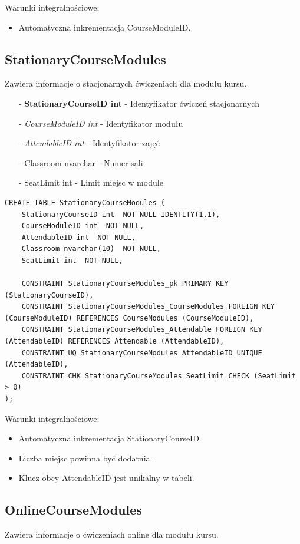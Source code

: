 \documentclass[11pt,a4paper]{article}
\begin{document}
Warunki integralnościowe:
\begin{itemize}
    \item Automatyczna inkrementacja CourseModuleID.
\end{itemize}

\subsection{StationaryCourseModules}
Zawiera informacje o stacjonarnych ćwiczeniach dla modułu kursu.

\begin{itemize}
    \item[-] \textbf{StationaryCourseID int} - Identyfikator ćwiczeń stacjonarnych
    \item[-] \textit{CourseModuleID int} - Identyfikator modułu
    \item[-] \textit{AttendableID int} - Identyfikator zajęć
    \item[-] Classroom nvarchar - Numer sali
    \item[-] SeatLimit int - Limit miejsc w module
\end{itemize}

\begin{Verbatim}[breaklines=true]
CREATE TABLE StationaryCourseModules (
    StationaryCourseID int  NOT NULL IDENTITY(1,1),
    CourseModuleID int  NOT NULL,
    AttendableID int  NOT NULL,
    Classroom nvarchar(10)  NOT NULL,
    SeatLimit int  NOT NULL,

    CONSTRAINT StationaryCourseModules_pk PRIMARY KEY (StationaryCourseID),
    CONSTRAINT StationaryCourseModules_CourseModules FOREIGN KEY (CourseModuleID) REFERENCES CourseModules (CourseModuleID),
    CONSTRAINT StationaryCourseModules_Attendable FOREIGN KEY (AttendableID) REFERENCES Attendable (AttendableID),
    CONSTRAINT UQ_StationaryCourseModules_AttendableID UNIQUE (AttendableID),
    CONSTRAINT CHK_StationaryCourseModules_SeatLimit CHECK (SeatLimit > 0)
);
\end{Verbatim}

Warunki integralnościowe:
\begin{itemize}
    \item Automatyczna inkrementacja StationaryCourseID.
    \item Liczba miejsc powinna być dodatnia.
    \item Klucz obcy AttendableID jest unikalny w tabeli.
\end{itemize}

\subsection{OnlineCourseModules}
Zawiera informacje o ćwiczeniach online dla modułu kursu.
\end{document}
